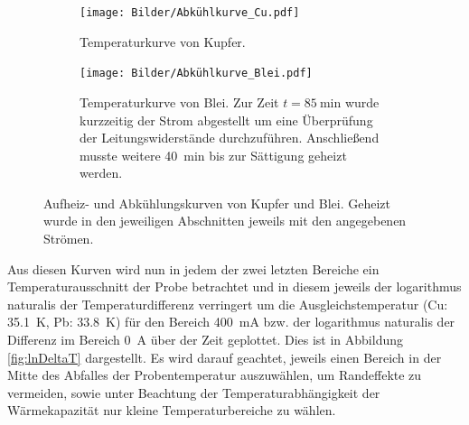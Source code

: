 \documentclass[parskip=half, a4paper,twoside,final]{article}
\begin{document}
\begin{figure}[h!t]
  \centering
  \begin{subfigure}{0.95\textwidth}
    \texttt{[image: Bilder/Abkühlkurve\_Cu.pdf]}
    \caption{Temperaturkurve von Kupfer.}
  \end{subfigure}
  \begin{subfigure}{0.95\textwidth}
    \texttt{[image: Bilder/Abkühlkurve\_Blei.pdf]}
    \caption{Temperaturkurve von Blei. Zur Zeit $t=\SI{85}{\minute}$ wurde kurzzeitig der Strom abgestellt um eine Überprüfung der Leitungswiderstände durchzuführen. Anschließend musste weitere \SI{40}{\minute} bis zur Sättigung geheizt werden.}
  \end{subfigure}
  \caption{Aufheiz- und Abkühlungskurven von Kupfer und Blei. Geheizt wurde in den jeweiligen Abschnitten jeweils mit den angegebenen Strömen.}
  \label{fig:Aufheiz-und Entladekurven}
\end{figure}
\newpage
Aus diesen Kurven wird nun in jedem der zwei letzten Bereiche ein Temperaturausschnitt der Probe betrachtet und in diesem jeweils der logarithmus naturalis der Temperaturdifferenz verringert um die Ausgleichstemperatur (Cu: \SI{35,1}{\kelvin}, Pb: \SI{33,8}{\kelvin}) für den Bereich \SI{400}{\milli\ampere} bzw. der logarithmus naturalis der Differenz im Bereich \SI{0}{\ampere} über der Zeit geplottet. Dies ist in Abbildung \ref{fig:lnDeltaT} dargestellt. Es wird darauf geachtet, jeweils einen Bereich in der Mitte des Abfalles der Probentemperatur auszuwählen, um Randeffekte zu vermeiden, sowie unter Beachtung der Temperaturabhängigkeit der Wärmekapazität nur kleine Temperaturbereiche zu wählen.
\end{document}
